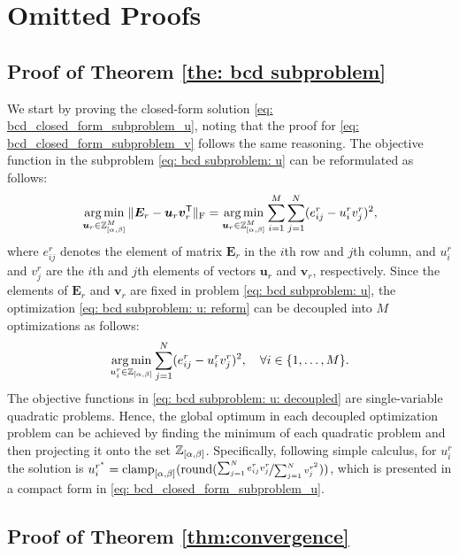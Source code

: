 
\section{Omitted Proofs}
\subsection{Proof of Theorem \ref{the: bcd subproblem}} \label{app: monotonicity proof}
We start by proving the closed-form solution \eqref{eq: bcd_closed_form_subproblem_u}, noting that the proof for \eqref{eq: bcd_closed_form_subproblem_v} follows the same reasoning. 
The objective function in the subproblem \eqref{eq: bcd subproblem: u} can be reformulated as follows:
\begin{align}
    \operatorname*{arg\,min}_{\bm{u}_r \in \mathbb Z_{[\alpha,\beta]}^M} \|\bm{E}_r - \bm{u}_r \bm{v}_r^\mathsf{T}\|_{\rm F} 
    = \operatorname*{arg\,min}_{\bm{u}_r \in \mathbb Z_{[\alpha,\beta]}^M}\sum_{i=1}^M \sum_{j=1}^N (e_{ij}^r - u_i^r v_j^r)^2,
    \label{eq: bcd subproblem: u: reform}
\end{align}
where $e_{ij}^r$ denotes the element of matrix $\bm{E}_r$ in the $i$th row and $j$th column, and $u_i^r$ and $v_j^r$ are the $i$th and $j$th elements of vectors $\bm{u}_r$ and $\bm{v}_r$, respectively.
Since the elements of $\bm{E}_r$ and $\bm v_r$ are fixed in problem \eqref{eq: bcd subproblem: u}, the optimization \eqref{eq: bcd subproblem: u: reform} can be decoupled into $M$ optimizations as follows:
\begin{align}
    \operatorname*{arg\,min}_{u^r_i \in \mathbb Z_{[\alpha,\beta]}} \sum_{j=1}^N (e_{ij}^r - u_i^r v_j^r)^2, \quad \forall i\in\{1,\dots,M\}.
    \label{eq: bcd subproblem: u: decoupled}
\end{align}
The objective functions in \eqref{eq: bcd subproblem: u: decoupled} are single-variable quadratic problems. Hence, the global optimum in each decoupled optimization problem can be achieved by finding the minimum of each quadratic problem and then projecting it onto the set $\mathbb Z_{[\alpha,\beta]}$. Specifically, following simple calculus, for $u^r_i$ the solution is $u^{r^\star}_i = \operatorname{clamp}_{[\alpha,\beta]}(\operatorname{round}(\nicefrac{\sum_{j=1}^N e_{ij}^r v_j^r}{\sum_{j=1}^N v_j^{r^2}}))$, which is presented in a compact form in \eqref{eq: bcd_closed_form_subproblem_u}.


\subsection{Proof of Theorem \ref{thm:convergence}} \label{app: convergence proof}

